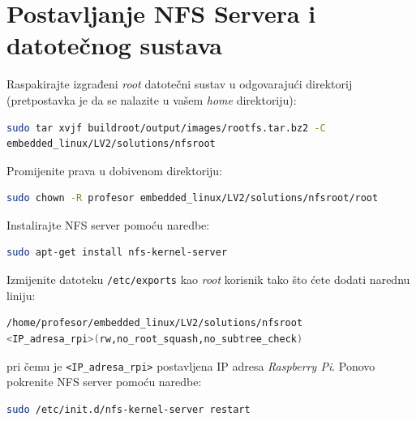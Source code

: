 \documentclass[11pt]{article}
\begin{document}
\section{Postavljanje NFS Servera i datotečnog sustava}
Raspakirajte izgrađeni \textit{root} datotečni sustav u odgovarajući direktorij
 (pretpostavka je da se nalazite u vašem \textit{home} direktoriju):
\begin{lstlisting}[language=bash]
sudo tar xvjf buildroot/output/images/rootfs.tar.bz2 -C
embedded_linux/LV2/solutions/nfsroot
\end{lstlisting}
Promijenite prava u dobivenom direktoriju:
\begin{lstlisting}[language=bash]
sudo chown -R profesor embedded_linux/LV2/solutions/nfsroot/root
\end{lstlisting}
Instalirajte NFS server pomoću naredbe:
\begin{lstlisting}[language=bash]
sudo apt-get install nfs-kernel-server
\end{lstlisting}
Izmijenite datoteku \texttt{/etc/exports} kao \textit{root} korisnik tako što
 ćete dodati narednu liniju:
\begin{lstlisting}[language=bash]
/home/profesor/embedded_linux/LV2/solutions/nfsroot
<IP_adresa_rpi>(rw,no_root_squash,no_subtree_check)
\end{lstlisting}
pri čemu je \texttt{<IP\_adresa\_rpi>} postavljena IP adresa \textit{Raspberry Pi}.
Ponovo pokrenite NFS server pomoću naredbe:
\begin{lstlisting}[language=bash]
sudo /etc/init.d/nfs-kernel-server restart
\end{lstlisting}
\end{document}
